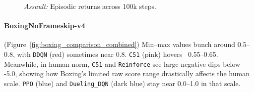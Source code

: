 \begin{figure} 
	\centering
	\quad
	\caption{\emph{Assault:} Episodic returns across 100k steps.}
	\label{fig:assault_comparison_combined}
\end{figure}

\paragraph{BoxingNoFrameskip-v4}
(Figure~\ref{fig:boxing_comparison_combined})
Min--max values bunch around 0.5--0.8, with \texttt{DDQN} (red) sometimes near 0.8. 
\texttt{C51} (pink) hovers ~0.55--0.65. Meanwhile, in human norm, 
\texttt{C51} and \texttt{Reinforce} see large negative dips below -5.0, 
showing how Boxing’s limited raw score range drastically affects the human scale. 
\texttt{PPO} (blue) and \texttt{Dueling\_DQN} (dark blue) stay near 0.0--1.0 
in that scale.

